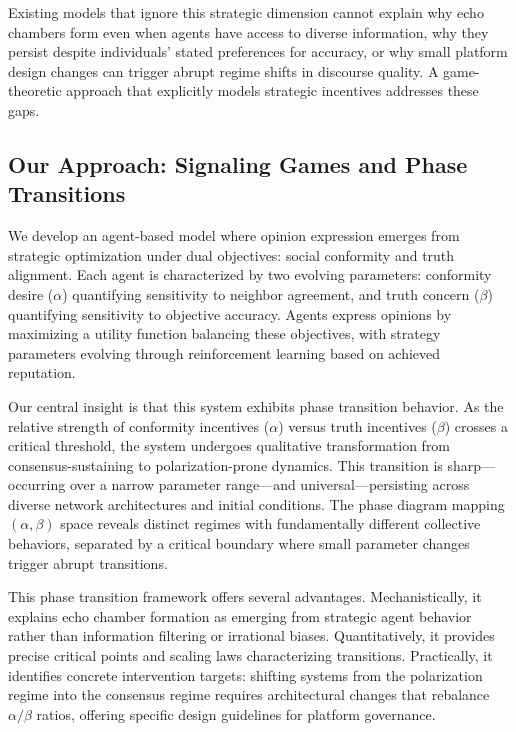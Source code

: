 \documentclass[11pt,a4paper]{article}
\begin{document}
Existing models that ignore this strategic dimension cannot explain why echo chambers form even when agents have access to diverse information, why they persist despite individuals' stated preferences for accuracy, or why small platform design changes can trigger abrupt regime shifts in discourse quality. A game-theoretic approach that explicitly models strategic incentives addresses these gaps.

\subsection{Our Approach: Signaling Games and Phase Transitions}

We develop an agent-based model where opinion expression emerges from strategic optimization under dual objectives: social conformity and truth alignment. Each agent is characterized by two evolving parameters: conformity desire ($\alpha$) quantifying sensitivity to neighbor agreement, and truth concern ($\beta$) quantifying sensitivity to objective accuracy. Agents express opinions by maximizing a utility function balancing these objectives, with strategy parameters evolving through reinforcement learning based on achieved reputation.

Our central insight is that this system exhibits phase transition behavior. As the relative strength of conformity incentives ($\alpha$) versus truth incentives ($\beta$) crosses a critical threshold, the system undergoes qualitative transformation from consensus-sustaining to polarization-prone dynamics. This transition is sharp—occurring over a narrow parameter range—and universal—persisting across diverse network architectures and initial conditions. The phase diagram mapping $(\alpha, \beta)$ space reveals distinct regimes with fundamentally different collective behaviors, separated by a critical boundary where small parameter changes trigger abrupt transitions.

This phase transition framework offers several advantages. Mechanistically, it explains echo chamber formation as emerging from strategic agent behavior rather than information filtering or irrational biases. Quantitatively, it provides precise critical points and scaling laws characterizing transitions. Practically, it identifies concrete intervention targets: shifting systems from the polarization regime into the consensus regime requires architectural changes that rebalance $\alpha/\beta$ ratios, offering specific design guidelines for platform governance.
\end{document}
